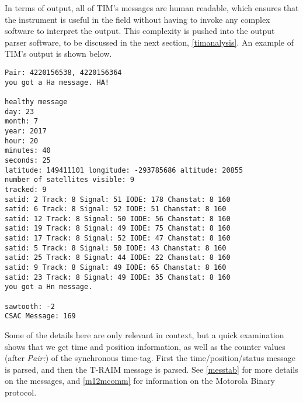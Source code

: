 In terms of output, all of TIM's messages are human readable, which ensures that the instrument is useful in the field without having to invoke any complex software to interpret the output. This complexity is pushed into the output parser software, to be discussed in the next section, \autoref{timanalysis}. An example of TIM's output is shown below. 
\begin{small}
\begin{singlespace}
\begin{verbatim}
Pair: 4220156538, 4220156364
you got a Ha message. HA! 

healthy message
day: 23
month: 7
year: 2017
hour: 20
minutes: 40
seconds: 25
latitude: 149411101 longitude: -293785686 altitude: 20855
number of satellites visible: 9
tracked: 9
satid: 2 Track: 8 Signal: 51 IODE: 178 Chanstat: 8 160
satid: 6 Track: 8 Signal: 52 IODE: 51 Chanstat: 8 160
satid: 12 Track: 8 Signal: 50 IODE: 56 Chanstat: 8 160
satid: 19 Track: 8 Signal: 49 IODE: 75 Chanstat: 8 160
satid: 17 Track: 8 Signal: 52 IODE: 47 Chanstat: 8 160
satid: 5 Track: 8 Signal: 50 IODE: 43 Chanstat: 8 160
satid: 25 Track: 8 Signal: 44 IODE: 22 Chanstat: 8 160
satid: 9 Track: 8 Signal: 49 IODE: 65 Chanstat: 8 160
satid: 23 Track: 8 Signal: 49 IODE: 35 Chanstat: 8 160
you got a Hn message. 

sawtooth: -2
CSAC Message: 169
\end{verbatim}
\end{singlespace}
\end{small}
\normalsize
Some of the details here are only relevant in context, but a quick examination shows that we get time and position information, as well as the counter values (after \textit{Pair:}) of the synchronous time-tag. First the time/position/status message is parsed, and then the T-RAIM message is parsed. See \autoref{messtab} for more details on the messages, and \autoref{m12mcomm} for information on the Motorola Binary protocol. 
